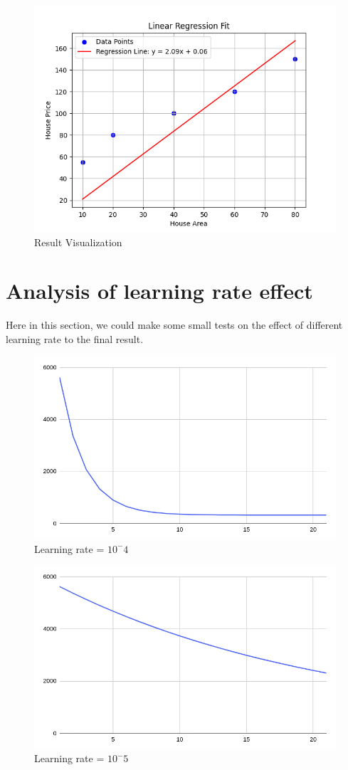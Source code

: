 \documentclass{article}
\begin{document}
\begin{figure}[H]
    \centering
    \includegraphics[width=0.8\linewidth]{image/regression.png}
    \caption{Result Visualization}
    \label{fig:vis}
\end{figure}

\section{Analysis of learning rate effect}
Here in this section, we could make some small tests on the effect of different learning rate to the final result. 

\begin{figure}[H]
    \centering
    \includegraphics[width=0.75\linewidth]{image/lr01.png}
    \caption{Learning rate = $10^-4$}
    \label{fig:lr01}
\end{figure}


\begin{figure}[H]
    \centering
    \includegraphics[width=0.75\linewidth]{image/lr11.png}
    \caption{Learning rate = $10^-5$}
    \label{fig:lr001}
\end{figure}
\end{document}
